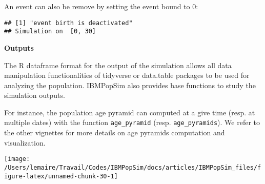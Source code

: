 An event can also be remove by setting the event bound to 0:

\begin{Shaded}
\begin{Highlighting}[]
\StringTok{ } \NormalTok{(}\NormalTok{=}\NormalTok{, }\NormalTok{=}\StringTok{ }\OperatorTok{*}\NormalTok{(}\OperatorTok{*}
 \NormalTok{) }
\end{Highlighting}
\end{Shaded}

\begin{verbatim}
## [1] "event birth is deactivated"
## Simulation on  [0, 30]
\end{verbatim}

\textbf{Outputs}

The R dataframe format for the output of the simulation allows all data manipulation functionalities of tidyverse or data.table packages to be used for analyzing the population. IBMPopSim also provides base functions to study the simulation outputs.

For instance, the population age pyramid can computed at a give time (resp. at multiple dates) with the function \texttt{age\_pyramid} (resp. \texttt{age\_pyramids}). We refer to the other vignettes for more details on age pyramids computation and visualization.

\begin{Shaded}
\begin{Highlighting}[]
\StringTok{ }\OperatorTok{$}

\StringTok{ } \OperatorTok{:} \NormalTok{) }
\end{Highlighting}
\end{Shaded}

\begin{center}\texttt{[image: /Users/lemaire/Travail/Codes/IBMPopSim/docs/articles/IBMPopSim\_files/figure-latex/unnamed-chunk-30-1]} \end{center}

